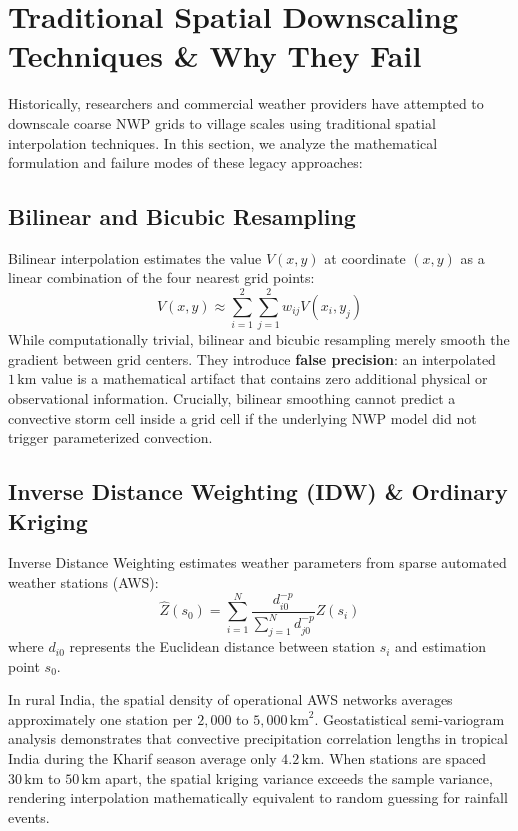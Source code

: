 \documentclass[11pt,a4paper,oneside]{report}
\begin{document}
\section{Traditional Spatial Downscaling Techniques \& Why They Fail}
Historically, researchers and commercial weather providers have attempted to downscale coarse NWP grids to village scales using traditional spatial interpolation techniques. In this section, we analyze the mathematical formulation and failure modes of these legacy approaches:

\subsection{Bilinear and Bicubic Resampling}
Bilinear interpolation estimates the value $V(x,y)$ at coordinate $(x,y)$ as a linear combination of the four nearest grid points:
\begin{equation}
V(x,y) \approx \sum_{i=1}^2 \sum_{j=1}^2 w_{ij} V(x_i, y_j)
\end{equation}
While computationally trivial, bilinear and bicubic resampling merely smooth the gradient between grid centers. They introduce \textbf{false precision}: an interpolated $1\,\text{km}$ value is a mathematical artifact that contains zero additional physical or observational information. Crucially, bilinear smoothing cannot predict a convective storm cell inside a grid cell if the underlying NWP model did not trigger parameterized convection.

\subsection{Inverse Distance Weighting (IDW) \& Ordinary Kriging}
Inverse Distance Weighting estimates weather parameters from sparse automated weather stations (AWS):
\begin{equation}
\hat{Z}(s_0) = \sum_{i=1}^N \frac{d_{i0}^{-p}}{\sum_{j=1}^N d_{j0}^{-p}} Z(s_i)
\end{equation}
where $d_{i0}$ represents the Euclidean distance between station $s_i$ and estimation point $s_0$. 

\begin{alertbox}
In rural India, the spatial density of operational AWS networks averages approximately one station per $2,000$ to $5,000\,\text{km}^2$. Geostatistical semi-variogram analysis demonstrates that convective precipitation correlation lengths in tropical India during the Kharif season average only $4.2\,\text{km}$. When stations are spaced $30\,\text{km}$ to $50\,\text{km}$ apart, the spatial kriging variance exceeds the sample variance, rendering interpolation mathematically equivalent to random guessing for rainfall events.
\end{alertbox}
\end{document}

